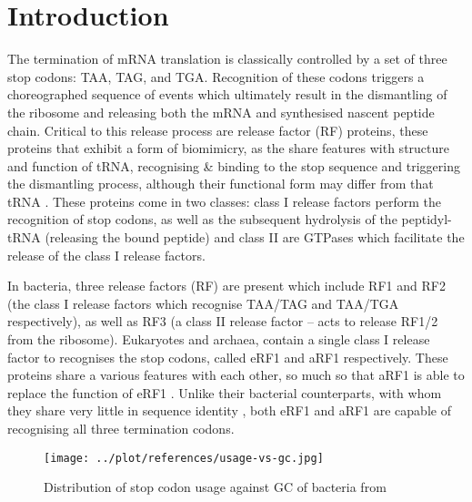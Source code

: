 \documentclass[../main.tex]{subfile}
\begin{document}
 \section{Introduction}
    The termination of mRNA translation is classically controlled by a set of three stop codons: TAA, TAG, and TGA. Recognition of these codons triggers a choreographed sequence of events which ultimately result in the dismantling of the ribosome and releasing both the mRNA and synthesised nascent peptide chain.
    Critical to this release process are release factor (RF) proteins, these proteins that exhibit a form of biomimicry, as the share features with structure and function of tRNA, recognising \& binding to the stop sequence and triggering the dismantling process, although their functional form may differ from that tRNA \autocite{Nakamura2003}.
    These proteins come in two classes: class I release factors perform the recognition of stop codons, as well as the subsequent hydrolysis of the peptidyl-tRNA (releasing the bound peptide) and class II are GTPases which facilitate the release of the class I release factors.

    In bacteria, three release factors (RF) are present which include RF1 and RF2 (the class I release factors which recognise TAA/TAG and TAA/TGA respectively), as well as RF3 (a class II release factor -- acts to release RF1/2 from the ribosome).
    Eukaryotes and archaea, contain a single class I release factor to recognises the stop codons, called eRF1 and aRF1 respectively. These proteins share a various features with each other, so much so that aRF1 is able to replace the function of eRF1 \autocite{Dontsova2000}. Unlike their bacterial counterparts, with whom they share very little in sequence identity \autocite{Inagaki2000}, both eRF1 and aRF1 are capable of recognising all three termination codons.

    \begin{wrapfigure}{r}{7.5cm}
        \centering
        \texttt{[image: ../plot/references/usage-vs-gc.jpg]}
        \caption{Distribution of stop codon usage against GC of bacteria from \mancite\cite{Korkmaz2014}}
        \label{fig:intro/codon-gc}
    \end{wrapfigure}
\end{document}
